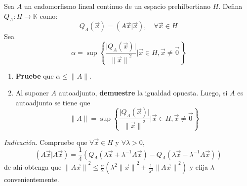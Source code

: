 \documentclass[12pt]{report}
\theoremstyle{largebreak}
\newcommand\abs[1]{\ensuremath{\big|#1\big|}}
\newcommand\cf[3]{\ensuremath{#1:#2\rightarrow#3}}
\newcommand\pint[2]{\ensuremath{\left(#1\big|#2\right)}}
\newcommand\norm[1]{\ensuremath{\|#1\|}}
\begin{document}
    \begin{excer}
        Sea $A$ un endomorfismo lineal continuo de un espacio prehilbertiano $H$. Defina $\cf{Q_A}{H}{\mathbb{K}}$ como:
        \begin{equation*}
            Q_A(\vec{x})=\pint{A\vec{x}}{\vec{x}},\quad\forall\vec{x}\in H
        \end{equation*}
        Sea
        \begin{equation*}
            \alpha=\sup\left\{\frac{\abs{Q_A(\vec{x})}}{\norm{\vec{x}}^2}\big| \vec{x}\in H,\vec{x}\neq\vec{0} \right\}
        \end{equation*}
        \begin{enumerate}
            \item \textbf{Pruebe} que $\alpha\leq\norm{A}$.
            \item Al suponer $A$ autoadjunto, \textbf{demuestre} la igualdad opuesta. Luego, si $A$ es autoadjunto se tiene que
            \begin{equation*}
                \norm{A}=\sup\left\{\frac{\abs{Q_A(\vec{x})}}{\norm{\vec{x}}^2}\big| \vec{x}\in H,\vec{x}\neq\vec{0} \right\}
            \end{equation*}
        \end{enumerate}
        \textit{Indicación}. Compruebe que $\forall\vec{x}\in H$ y $\forall\lambda>0$,
        \begin{equation*}
            \pint{A\vec{x}}{A\vec{x}}=\frac{1}{4}\left(Q_A(\lambda\vec{x}+\lambda^{-1}A\vec{x})-Q_A(\lambda\vec{x}-\lambda^{-1}A\vec{x})\right)
        \end{equation*}
        de ahí obtenga que $\norm{A\vec{x}}^2\leq\frac{\alpha}{2}\left(\lambda^2\norm{\vec{x}}^2+\frac{1}{\lambda^2}\norm{A\vec{x}}^2 \right)$ y elija $\lambda$ convenientemente.
    \end{excer}
\end{document}
